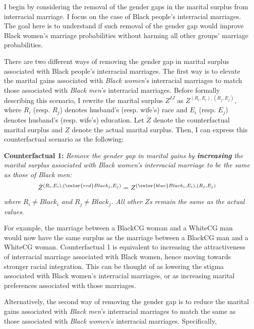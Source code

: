 I begin by considering the removal of the gender gaps in the marital surplus from interracial marriage. I focus on the case of Black people's interracial marriages. The goal here is to understand if such removal of the gender gap would improve Black women's marriage probabilities without harming all other groups' marriage probabilities. 

There are two different ways of removing the gender gap in marital surplus associated with Black people's interracial marriages. The first way is to elevate the marital gains associated with \textit{Black women}'s interracial marriages to match those associated with \textit{Black men}'s interracial marriages. Before formally describing this scenario, I rewrite the marital surplus $Z^{IJ}$ as $Z^{(R_i, E_i), (R_j, E_j)}$, where $R_i$ (resp. $R_j$) denotes husband's (resp. wife's) race and $E_i$ (resp. $E_j$) denotes husband's (resp. wife's) education. Let $\tilde{Z}$ denote the counterfactual marital surplus and $Z$ denote the actual marital surplus. Then, I can express this counterfactual scenario as the following: 

\vspace{2mm}
\noindent \textbf{Counterfactual 1:} \textit{Remove the gender gap in marital gains  by \textbf{increasing} the marital surplus associated with Black women's interracial marriage to be the same as those of Black men: }
\begin{align}
	\tilde{Z}^{(R_i, E_i), ({\color{red}Black_j}, E_j)} = Z^{({\color{blue}Black_i}, E_i), (R_j, E_j)} \label{eq:cf1gendergap}
\end{align}
\textit{where $R_i \neq Black_i$ and $R_j \neq Black_j$. All other $Z$s remain the same as the actual values.} 

\noindent For example, the marriage between a BlackCG woman and a WhiteCG man would now have the same surplus as the marriage between a BlackCG man and a WhiteCG woman. Counterfactual 1 is equivalent to increasing the attractiveness of interracial marriage associated with Black women, hence moving towards stronger racial integration. This can be thought of as lowering the stigma associated with Black women's interracial marriages, or as increasing marital preferences associated with those marriages. 

Alternatively, the second way of removing the gender gap is to reduce the marital gains associated with \textit{Black men}'s interracial marriages to match the same as those associated with \textit{Black women}'s interracial marriages. Specifically, 

